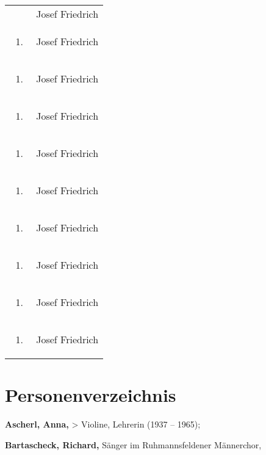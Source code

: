 \documentclass[a4paper]{article}
\begin{document}
\begin{flushleft}
\begin{supertabular}{m{1.2409999cm}m{14.604cm}}
\begin{enumerate}
\end{enumerate}
 &
Josef Friedrich\\
\begin{enumerate}
\item 
\end{enumerate}
 &
Josef Friedrich\\
\begin{enumerate}
\item 
\end{enumerate}
 &
Josef Friedrich\\
\begin{enumerate}
\item 
\end{enumerate}
 &
Josef Friedrich\\
\begin{enumerate}
\item 
\end{enumerate}
 &
Josef Friedrich\\
\begin{enumerate}
\item 
\end{enumerate}
 &
Josef Friedrich\\
\begin{enumerate}
\item 
\end{enumerate}
 &
Josef Friedrich\\
\begin{enumerate}
\item 
\end{enumerate}
 &
Josef Friedrich\\
\begin{enumerate}
\item 
\end{enumerate}
 &
Josef Friedrich\\
\begin{enumerate}
\item 
\end{enumerate}
 &
Josef Friedrich\\
\end{supertabular}
\end{flushleft}
\section{Personenverzeichnis}
\hypertarget{RefHeadingToc100333759}{}\textbf{Ascherl, Anna,}
{\textgreater} Violine, Lehrerin (1937 – 1965); 

\textbf{Bartascheck, Richard, }Sänger im Ruhmannsfeldener Männerchor,
\end{document}
